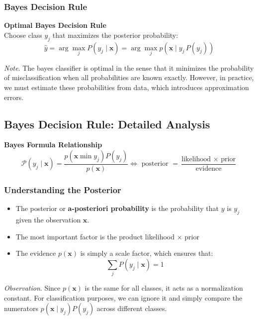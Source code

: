 \documentclass[a4paper]{article}
\theoremstyle{definition}
\begin{document}
\subsubsection{Bayes Decision Rule}
\begin{tcolorbox}[
    colback=magenta!15!white,
    colframe=magenta!15!white,
    boxrule=0pt,
    arc=0pt,
    halign=center
]
    \textbf{Optimal Bayes Decision Rule}\\[0.6em]
    Choose class $y_j$ that maximizes the posterior probability:
    \[
      \hat{y} = \arg\max_{j} P(y_j \mid \mathbf{x})
              = \arg\max_{j} p(\mathbf{x} \mid y_j\,P(y_j))
    \]
\end{tcolorbox}
\textit{Note}. The bayes classifier is optimal in the sense that it minimizes the probability of misclassification when all probabilities
are known exactly. However, in practice, we must estimate these probabilities from data, which introduces approximation errors.
\subsection{Bayes Decision Rule: Detailed Analysis}
\begin{tcolorbox}[
    colback=yellow!15!white,
    colframe=yellow!15!white,
    boxrule=0pt,
    arc=0pt,
    halign=center
]
    \textbf{Bayes Formula Relationship}\\[0.6em]
    \[
      \mathcal{P}(y_j \mid \mathbf{x}) = \frac{p(\mathbf{x} \min y_j)P(y_j)}{p(\mathbf{x})} \Leftrightarrow \text{ posterior } = \frac{\text{likelihood } \times \text{ prior}}{\text{evidence}}
    \]
\end{tcolorbox}
\subsubsection{Understanding the Posterior}
\begin{itemize}
    \item The posterior or \textbf{a-posteriori probability} is the probability that \( y \) is \( y_j \) given the observation \( \mathbf{x} \).
    \item The most important factor is the product likelihood \( \times \) prior
    \item The evidence \( p(\mathbf{x}) \) is simply a scale factor, which ensures that:
    \[
      \sum_{j} P(y_j \mid \mathbf{x}) = 1
    \]
\end{itemize}
\textit{Observation}. Since \( p(\mathbf{x}) \) is the same for all classes, it acts as a normalization constant. For classification 
purposes, we can ignore it and simply compare the numerators \( p(\mathbf{x} \mid y_j)P(y_j) \) across different classes.
\end{document}
